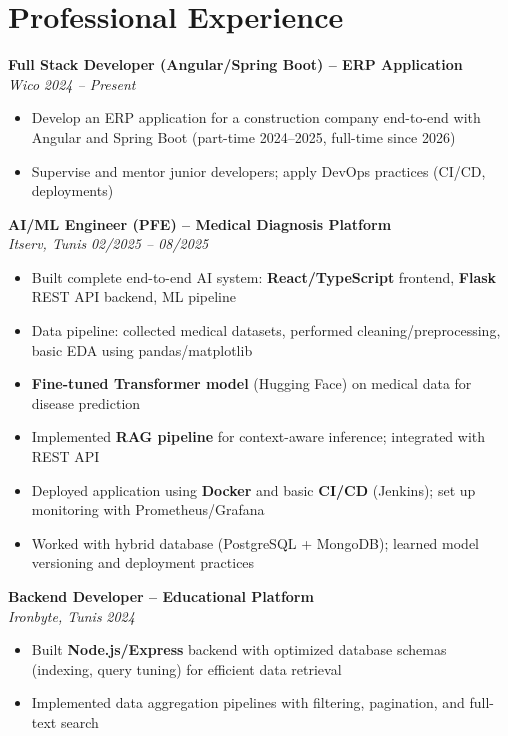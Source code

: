 \documentclass[10pt,a4paper]{article}
\begin{document}
\section*{Professional Experience}
{\small

\textbf{Full Stack Developer (Angular/Spring Boot) -- ERP Application}\\[1pt]
\textit{Wico} \hfill \textit{2024 -- Present}
\begin{itemize}
  \item Develop an ERP application for a construction company end-to-end with Angular and Spring Boot (part-time 2024--2025, full-time since 2026)
  \item Supervise and mentor junior developers; apply DevOps practices (CI/CD, deployments)
\end{itemize}

\vspace{3pt}
\textbf{AI/ML Engineer (PFE) -- Medical Diagnosis Platform}\\[1pt]
\textit{Itserv, Tunis} \hfill \textit{02/2025 -- 08/2025}
\begin{itemize}
  \item Built complete end-to-end AI system: \textbf{React/TypeScript} frontend, \textbf{Flask} REST API backend, ML pipeline
  \item Data pipeline: collected medical datasets, performed cleaning/preprocessing, basic EDA using pandas/matplotlib
  \item \textbf{Fine-tuned Transformer model} (Hugging Face) on medical data for disease prediction
  \item Implemented \textbf{RAG pipeline} for context-aware inference; integrated with REST API
  \item Deployed application using \textbf{Docker} and basic \textbf{CI/CD} (Jenkins); set up monitoring with Prometheus/Grafana
  \item Worked with hybrid database (PostgreSQL + MongoDB); learned model versioning and deployment practices
\end{itemize}

\vspace{3pt}
\textbf{Backend Developer -- Educational Platform}\\[1pt]
\textit{Ironbyte, Tunis} \hfill \textit{2024}
\begin{itemize}
  \item Built \textbf{Node.js/Express} backend with optimized database schemas (indexing, query tuning) for efficient data retrieval
  \item Implemented data aggregation pipelines with filtering, pagination, and full-text search
\end{itemize}

}
\end{document}
